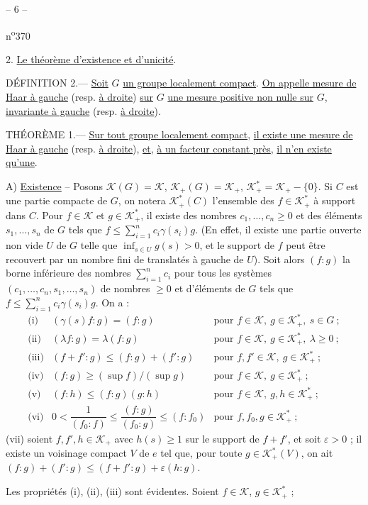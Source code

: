 \begin{center}-- 6 --\end{center}\hfill n\textsuperscript{o}370

2. \uline{Le théorème d'existence et d'unicité}.

DÉFINITION 2.--- \uline{Soit} $G$ \uline{un groupe localement compact}. \uline{On appelle mesure de Haar à gauche} (resp. \uline{à droite}) \uline{sur} $G$ \uline{une mesure positive non nulle sur} $G$, \uline{invariante à gauche} (resp. \uline{à droite}).

THÉORÈME 1.--- \uline{Sur tout groupe localement compact}, \uline{il existe une mesure de Haar à gauche} (resp. \uline{à droite}), \uline{et}, \uline{à un facteur constant près}, \uline{il n'en existe qu'une}.

A) \uline{Existence} -- Posons $\mathcal K(G)=\mathcal K$, $\mathcal K_+(G)=\mathcal K_+$, $\mathcal K^*_+=\mathcal K_+-\{0\}$. Si $C$ est une partie compacte de $G$, on notera $\mathcal K^*_+(C)$ l'ensemble des $f\in\mathcal K^*_+$ à support dans $C$. Pour $f\in\mathcal K$ et $g\in\mathcal K^*_+$, il existe des nombres $c_1,\ldots,c_n\geq0$ et des éléments $s_1,\ldots,s_n$ de $G$ tels que $f\leq\sum_{i=1}^n c_i\gamma(s_i)g$. (En effet, il existe une partie ouverte non vide $U$ de $G$ telle que $\inf_{s\in U}g(s)>0$, et le support de $f$ peut être recouvert par un nombre fini de translatés à gauche de $U$). Soit alors $(f:g)$ la borne inférieure des nombres $\sum_{i=1}^n c_i$ pour tous les systèmes $(c_1,\ldots,c_n,s_1,\ldots,s_n)$ de nombres $\geq0$ et d'éléments de $G$ tels que $f\leq\sum_{i=1}^n c_i\gamma(s_i)g$. On a :
\[
\begin{array}{lll}
\text{(i)}&(\gamma(s)f:g)=(f:g)&\text{pour }f\in\mathcal K,\ g\in\mathcal K^*_+,\ s\in G\ ;\\
\text{(ii)}&(\lambda f:g)=\lambda(f:g)&\text{pour }f\in\mathcal K,\ g\in\mathcal K^*_+,\ \lambda\geq0\ ;\\
\text{(iii)}&(f+f':g)\leq(f:g)+(f':g)&\text{pour }f,f'\in\mathcal K,\ g\in\mathcal K^*_+\ ;\\
\text{(iv)}&(f:g)\geq(\sup f)/(\sup g)&\text{pour }f\in\mathcal K,\ g\in\mathcal K^*_+\ ;\\
\text{(v)}&(f:h)\leq(f:g)(g:h)&\text{pour }f\in\mathcal K,\ g,h\in\mathcal K^*_+\ ;\\
\text{(vi)}&0<\dfrac1{(f_0:f)}\leq\dfrac{(f:g)}{(f_0:g)}\leq(f:f_0)&\text{pour }f,f_0,g\in\mathcal K^*_+\ ;
\end{array}
\]
(vii) soient $f,f',h\in\mathcal K_+$ avec $h(s)\geq1$ sur le support de $f+f'$, et soit $\varepsilon>0$ ; il existe un voisinage compact $V$ de $e$ tel que, pour toute $g\in\mathcal K^*_+(V)$, on ait $(f:g)+(f':g)\leq(f+f':g)+\varepsilon(h:g)$.

Les propriétés (i), (ii), (iii) sont évidentes. Soient $f\in\mathcal K$, $g\in\mathcal K^*_+$ ;
